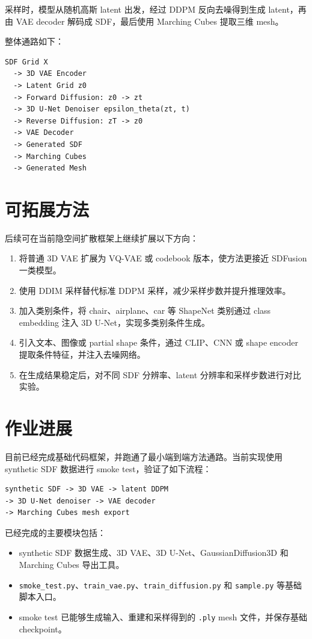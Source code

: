 \documentclass[UTF8,a4paper,12pt]{ctexart}
\begin{document}
采样时，模型从随机高斯 latent 出发，经过 DDPM 反向去噪得到生成 latent，再由 VAE decoder 解码成 SDF，最后使用 Marching Cubes 提取三维 mesh。

整体通路如下：
\begin{lstlisting}
SDF Grid X
  -> 3D VAE Encoder
  -> Latent Grid z0
  -> Forward Diffusion: z0 -> zt
  -> 3D U-Net Denoiser epsilon_theta(zt, t)
  -> Reverse Diffusion: zT -> z0
  -> VAE Decoder
  -> Generated SDF
  -> Marching Cubes
  -> Generated Mesh
\end{lstlisting}

\section{可拓展方法}

后续可在当前隐空间扩散框架上继续扩展以下方向：
\begin{enumerate}
    \item 将普通 3D VAE 扩展为 VQ-VAE 或 codebook 版本，使方法更接近 SDFusion 一类模型。
    \item 使用 DDIM 采样替代标准 DDPM 采样，减少采样步数并提升推理效率。
    \item 加入类别条件，将 chair、airplane、car 等 ShapeNet 类别通过 class embedding 注入 3D U-Net，实现多类别条件生成。
    \item 引入文本、图像或 partial shape 条件，通过 CLIP、CNN 或 shape encoder 提取条件特征，并注入去噪网络。
    \item 在生成结果稳定后，对不同 SDF 分辨率、latent 分辨率和采样步数进行对比实验。
\end{enumerate}

\section{作业进展}

目前已经完成基础代码框架，并跑通了最小端到端方法通路。当前实现使用 synthetic SDF 数据进行 smoke test，验证了如下流程：
\begin{lstlisting}
synthetic SDF -> 3D VAE -> latent DDPM
-> 3D U-Net denoiser -> VAE decoder
-> Marching Cubes mesh export
\end{lstlisting}

已经完成的主要模块包括：
\begin{itemize}
    \item synthetic SDF 数据生成、3D VAE、3D U-Net、GaussianDiffusion3D 和 Marching Cubes 导出工具。
    \item \texttt{smoke\_test.py}、\texttt{train\_vae.py}、\texttt{train\_diffusion.py} 和 \texttt{sample.py} 等基础脚本入口。
    \item smoke test 已能够生成输入、重建和采样得到的 \texttt{.ply} mesh 文件，并保存基础 checkpoint。
\end{itemize}
\end{document}
